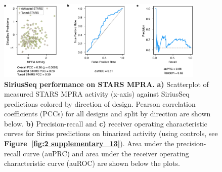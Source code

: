 \begin{figure}[p]
    \centering
    \includegraphics[width=0.88\textwidth]{2_figures-and-files/SuppFig14.png}
    \caption[SiriusSeq performance on STARS MPRA.]{\textbf{SiriusSeq performance on STARS MPRA.} \textbf{a)} Scatterplot of measured STARS MPRA activity (x-axis) against SiriusSeq predictions colored by direction of design. Pearson correlation coefficients (PCCs) for all designs and split by direction are shown below. \textbf{b)} Precision-recall and \textbf{c)} receiver operating characteristic curves for Sirius predictions on binarized activity (using controls, see \textbf{Figure~\ref{fig:2 supplementary_13}}). Area under the precision-recall curve (auPRC) and area under the receiver operating characteristic curve (auROC) are shown below the plots.}
    \label{fig:2 supplementary_14}
\end{figure}

